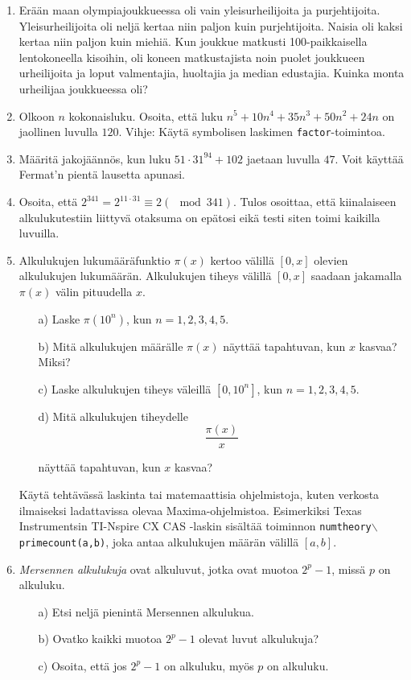 \begin{enumerate}
\item Erään maan olympiajoukkueessa oli vain yleisurheilijoita ja
purjehtijoita. Yleisurheilijoita oli neljä kertaa niin paljon kuin
purjehtijoita. Naisia oli kaksi kertaa niin paljon kuin miehiä.
Kun joukkue matkusti 100-paikkaisella lentokoneella kisoihin,
oli koneen matkustajista noin puolet joukkueen urheilijoita ja
loput valmentajia, huoltajia ja median edustajia. Kuinka monta
urheilijaa joukkueessa oli?

\item Olkoon $n$ kokonaisluku. Osoita, että luku
$n^5+10n^4+35n^3+50n^2+24n$ on jaollinen luvulla $120$. Vihje:
Käytä symbolisen laskimen {\tt factor}-toimintoa.

\item
Määritä jakojäännös, kun luku $51\cdot 31^{94}+102$ jaetaan
luvulla $47$. Voit käyttää Fermat'n pientä lausetta apunasi.

\item Osoita, että $2^{341} = 2^{11 \cdot 31} \equiv 2 (\mod 341)
$. Tulos osoittaa, että kiinalaiseen alkulukutestiin liittyvä
otaksuma on epätosi eikä testi siten toimi kaikilla luvuilla.

\item
Alkulukujen lukumääräfunktio $\pi(x)$ kertoo välillä $[0,x]$
olevien alkulukujen lukumäärän. Alkulukujen tiheys välillä $[0,x]
$ saadaan jakamalla $\pi(x)$ välin pituudella $x$.
\begin{itemize}
\item[a)] Laske $\pi(10^n)$, kun $n=1,2,3,4,5$.
\item[b)] Mitä alkulukujen määrälle $\pi(x)$ näyttää tapahtuvan,
kun $x$ kasvaa? Miksi?
\item[c)] Laske alkulukujen tiheys väleillä $[0,10^n]$, kun
$n=1,2,3,4,5$.
\item[d)] Mitä alkulukujen tiheydelle
\[
\frac{\pi(x)}{x}
\]

näyttää tapahtuvan, kun $x$ kasvaa?
\end{itemize}
Käytä tehtävässä laskinta tai matemaattisia ohjelmistoja, kuten
verkosta ilmaiseksi ladattavissa olevaa Maxima-ohjelmistoa.
Esimerkiksi Texas Instrumentsin TI-Nspire CX CAS -laskin sisältää
toiminnon {\tt numtheory$\backslash$primecount(a,b)}, joka antaa
alkulukujen määrän välillä $[a,b]$.

\item {\em Mersennen alkulukuja} ovat alkuluvut, jotka ovat
muotoa $2^p - 1$, missä $p$ on alkuluku.
\begin{itemize}
\item[a)] Etsi neljä pienintä Mersennen alkulukua.
\item[b)] Ovatko kaikki muotoa $2^p - 1$ olevat luvut alkulukuja?
\item[c)] Osoita, että jos $2^p - 1$ on alkuluku, myös $p$ on
alkuluku.


\end{itemize}
\end{enumerate}
